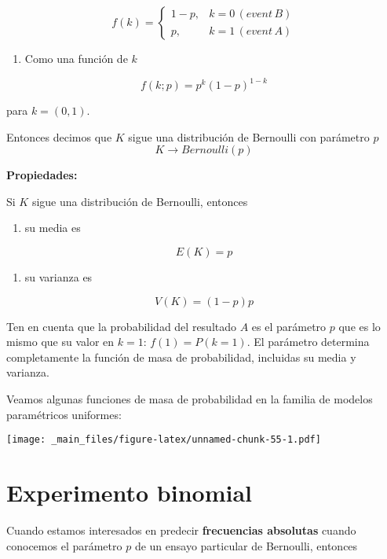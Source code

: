 \documentclass[
]{book}
\providecommand{\tightlist}{%
  \setlength{\itemsep}{0pt}\setlength{\parskip}{0pt}}
\begin{document}
\[
    f(k)= 
\begin{cases}
    1-p,&  k=0\, (event\, B)\\
    p,& k=1\, (event\, A) 
\end{cases}
\]

\begin{enumerate}
\def\labelenumi{\arabic{enumi})}
\setcounter{enumi}{2}
\tightlist
\item
  Como una función de \(k\)
\end{enumerate}

\[f(k; p)=p^k(1-p)^{1-k} \]

para \(k=(0,1)\).

Entonces decimos que \(K\) sigue una distribución de Bernoulli con parámetro \(p\)
\[K \rightarrow Bernoulli(p)\]

\textbf{Propiedades:}

Si \(K\) sigue una distribución de Bernoulli, entonces

\begin{enumerate}
\def\labelenumi{\arabic{enumi})}
\tightlist
\item
  su media es
\end{enumerate}

\[E(K)=p\]

\begin{enumerate}
\def\labelenumi{\arabic{enumi})}
\setcounter{enumi}{1}
\tightlist
\item
  su varianza es
\end{enumerate}

\[V(K)=(1-p)p\]

Ten en cuenta que la probabilidad del resultado \(A\) es el parámetro \(p\)
que es lo mismo que su valor en \(k=1\): \(f(1)=P(k=1)\). El parámetro determina completamente la función de masa de probabilidad, incluidas su media y varianza.

Veamos algunas funciones de masa de probabilidad en la familia de modelos paramétricos uniformes:

\texttt{[image: \_main\_files/figure-latex/unnamed-chunk-55-1.pdf]}

\hypertarget{experimento-binomial}{%
\section{Experimento binomial}\label{experimento-binomial}}

Cuando estamos interesados en predecir \textbf{frecuencias absolutas} cuando conocemos el parámetro \(p\) de un ensayo particular de Bernoulli, entonces
\end{document}
